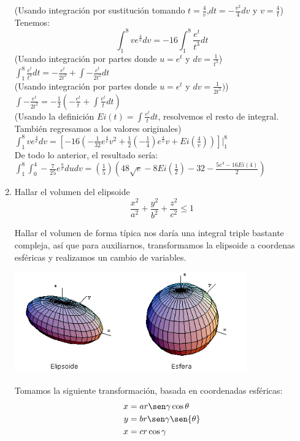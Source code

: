 \documentclass{article}
\begin{document}
\begin{enumerate}
{             (Usando integración por sustitución tomando $t =\frac{4}{v}$,$dt = -\frac{v^2}{4}dv$ y $v= \frac{4}{t}$) Tenemos:
             $$\int_{1}^{8} ve^{\frac{4}{v}}dv = -16\int_{1}^{8} \frac{e^{t}}{t^3}dt$$
             (Usando integración por partes donde $u = e^t$ y $dv = \frac{1}{t^3}$)
             $\int_{1}^{8} \frac{e^{t}}{t^3}dt = -\frac{e^t}{2t^2} + \int-\frac{e^t}{2t^2}dt$\\
             (Usando integración por partes donde $u = e^t$ y $dv = \frac{1}{2t^2})$)\\
             $\int-\frac{e^t}{2t^2} = -\frac{1}{2} (-\frac{e^t}{t} + \int\frac{e^t}{t}dt)$\\
             (Usando la definición $Ei(t) = \int\frac{e^t}{t}dt$, resolvemos el resto de integral. También regresamos a los valores originales)\\
             $\int_{1}^{8} ve^{\frac{4}{v}}dv = [-16(-\frac{1}{32}e^{\frac{4}{v}}v^2 + \frac{1}{2}(-\frac{1}{4})e^{\frac{4}{v}}v + Ei(\frac{4}{v}))]\Big|_1^8$\\

             De todo lo anterior, el resultado sería:\\
             $\int_{1}^{8}\int_{0}^{4}-\frac{7}{25}e^{\frac{u}{v}}dudv = (\frac{1}{5})(48\sqrt{e} - 8Ei(\frac{1}{2}) - 32 - \frac{5e^4 - 16Ei(4)}{2})$
        }

        \item {
            Hallar el volumen del elipsoide
            \[
                \frac{x^2}{a^2}+\frac{y^2}{b^2}+\frac{z^2}{c^2}\leq 1
            \]

            \color{azul}
            Hallar el volumen de forma típica nos daría una integral triple
            bastante compleja, así que para auxiliarnos, transformamos la
            elipsoide a coordenas esféricas y realizamos un cambio de variables.
            \begin{center}
                \includegraphics[width=10cm]{img/elipsoide.png}
        	\end{center}
            Tomamos la siguiente transformación, basada en coordenadas esféricas:
            \begin{align*}
                x &= ar\sen\gamma\cos{\theta}\\
                y &= br\sen\gamma\sen{\theta}\\
                x &= cr\cos\gamma
            \end{align*}

}
\end{enumerate}
\end{document}
